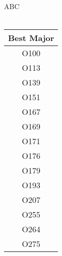 
\begin{multicols}{2}
\begin{center}
    ABC \\
    \\
    \begin{tabular}{|c|}
        \hline 
        Best Major \\
        \hline
        O100 \\
        \hline
        O113\\
        \hline
        O139 \\
        \hline
        O151 \\
        \hline
        O167 \\
        \hline
        O169 \\
        \hline
        O171\\ 
        \hline
        O176\\ 
        \hline
        O179\\ 
        \hline
        O193\\
        \hline
        O207\\
        \hline
        O255\\
        \hline
        O264\\
        \hline
        O275\\
        \hline
    \end{tabular}
    \\
    

\end{center}
\end{multicols}
